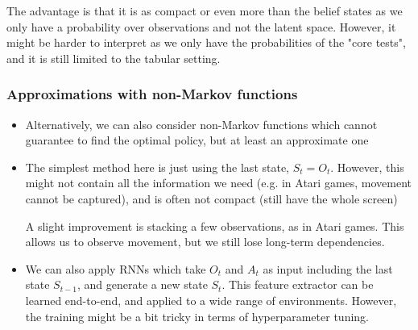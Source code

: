 \begin{itemize}
	The advantage is that it is as compact or even more than the belief states as we only have a probability over observations and not the latent space. However, it might be harder to interpret as we only have the probabilities of the "core tests", and it is still limited to the tabular setting.
\end{itemize}
\subsubsection{Approximations with non-Markov functions}
\begin{itemize}
	\item Alternatively, we can also consider non-Markov functions which cannot guarantee to find the optimal policy, but at least an approximate one
	\item The simplest method here is just using the last state, $S_t=O_t$. However, this might not contain all the information we need (e.g. in Atari games, movement cannot be captured), and is often not compact (still have the whole screen)
	
	A slight improvement is stacking a few observations, as in Atari games. This allows us to observe movement, but we still lose long-term dependencies.
	\item We can also apply RNNs which take $O_t$ and $A_t$ as input including the last state $S_{t-1}$, and generate a new state $S_t$. This feature extractor can be learned end-to-end, and applied to a wide range of environments. However, the training might be a bit tricky in terms of hyperparameter tuning. 
\end{itemize}

